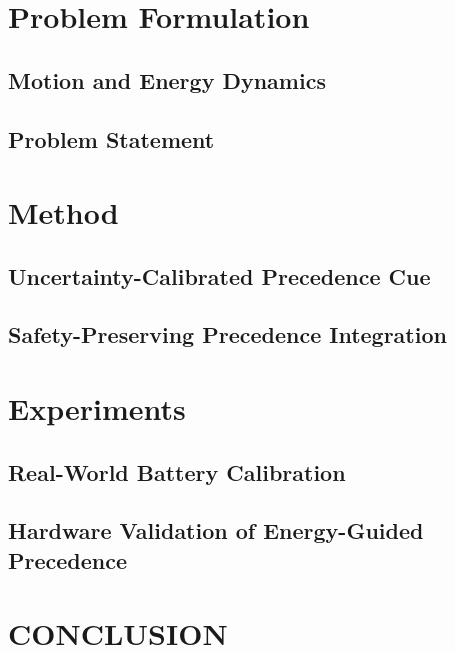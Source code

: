 \documentclass[letterpaper, 10 pt, conference]{ieeeconf}
\begin{document}
\section{Problem Formulation}\label{sec:problem_formulation}

\subsection{Motion and Energy Dynamics}\label{sec:3.A}

\subsection{Problem Statement}\label{sec:3.B}

\section{Method}

\subsection{Uncertainty-Calibrated Precedence Cue}\label{sec:4.A}

% 
\subsection{Safety-Preserving Precedence Integration}\label{sec:4.C}

\section{Experiments}

\subsection{Real-World Battery Calibration}\label{sec:5.A}

\subsection{Hardware Validation of Energy-Guided Precedence}\label{sec:5.B}

\section{CONCLUSION}

\addtolength{\textheight}{0cm}   %
\end{document}
